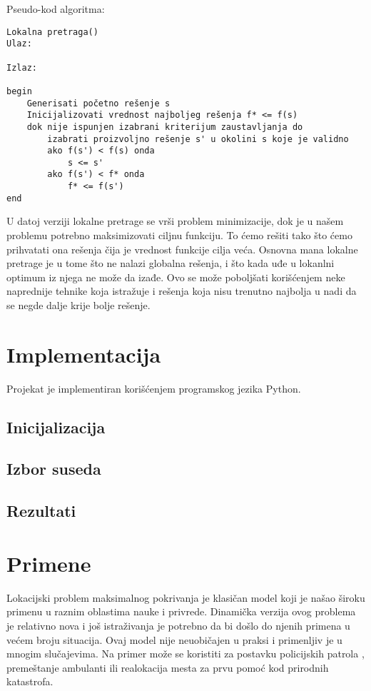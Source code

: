 \documentclass[a4paper]{article}
\begin{document}
Pseudo-kod algoritma:
\begin{verbatim}
Lokalna pretraga()
Ulaz:

Izlaz:

begin
    Generisati početno rešenje s
    Inicijalizovati vrednost najboljeg rešenja f* <= f(s)
    dok nije ispunjen izabrani kriterijum zaustavljanja do
        izabrati proizvoljno rešenje s' u okolini s koje je validno
        ako f(s') < f(s) onda
            s <= s'
        ako f(s') < f* onda
            f* <= f(s')	
end
\end{verbatim}

U datoj verziji lokalne pretrage se vrši problem minimizacije, dok je u našem problemu potrebno maksimizovati ciljnu funkciju. To ćemo rešiti tako što ćemo prihvatati ona rešenja čija je vrednost funkcije cilja veća. Osnovna mana lokalne pretrage je u tome što ne nalazi globalna rešenja, i što kada uđe u lokanlni optimum iz njega ne može da izađe. Ovo se može poboljšati korišćenjem neke naprednije tehnike koja istražuje i rešenja koja nisu trenutno najbolja u nadi da se negde dalje krije bolje rešenje.

\section{Implementacija}

Projekat je implementiran korišćenjem programskog jezika Python. 
\subsection{Inicijalizacija}
\subsection{Izbor suseda}
\subsection{Rezultati}

\section{Primene}
Lokacijski problem maksimalnog pokrivanja je klasičan model koji je našao široku primenu u raznim oblastima nauke i privrede. Dinamička verzija ovog problema je relativno nova i još istraživanja je potrebno da bi došlo do njenih primena u većem broju situacija. Ovaj model nije neuobičajen u praksi i primenljiv je u mnogim slučajevima. Na primer može se koristiti za postavku policijskih patrola \cite{police}, premeštanje ambulanti \cite{ambulance} ili realokacija mesta za prvu pomoć kod prirodnih katastrofa.

\appendix
 

\end{document}
